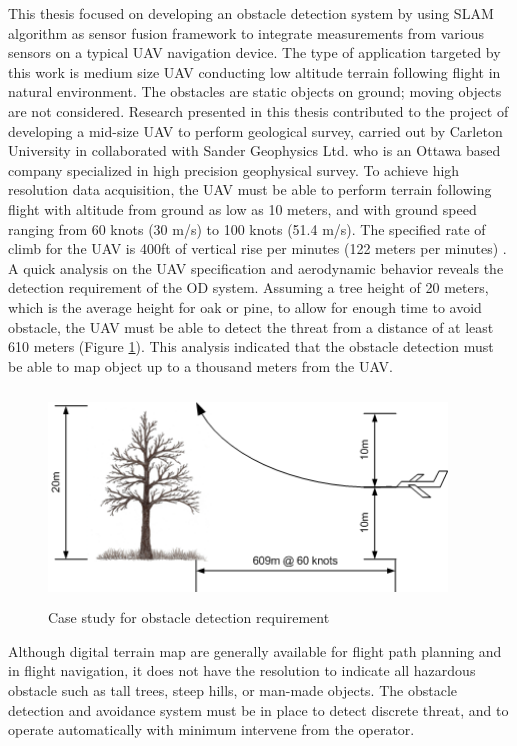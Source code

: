 This thesis focused on developing an obstacle detection system by
using SLAM algorithm as sensor fusion framework to integrate
measurements from various sensors on a typical UAV navigation device.
The type of application targeted by this work is medium size UAV
conducting low altitude terrain following flight in natural
environment. The obstacles are static objects on ground; moving
objects are not considered. Research presented in this thesis
contributed to the project of developing a mid-size UAV to perform
geological survey, carried out by Carleton University in collaborated
with Sander Geophysics Ltd. who is an Ottawa based company specialized in
high precision geophysical survey. To achieve high resolution data
acquisition, the UAV must be able to perform terrain following flight
with altitude from ground as low as 10 meters, and with ground speed
ranging from 60 knots (30 m/s) to 100 knots (51.4 m/s). The specified
rate of climb for the UAV is 400ft of vertical rise per minutes (122
meters per minutes) \cite{james_geosurv_2008}. A quick analysis on the
UAV specification and aerodynamic behavior reveals the detection
requirement of the OD system. Assuming a tree height of 20 meters,
which is the average height for oak or pine, to allow for enough time
to avoid obstacle, the UAV must be able to detect the threat from a
distance of at least 610 meters (Figure \ref{ob}). This analysis
indicated that the obstacle detection must be able to map object up to
a thousand meters from the UAV.

\begin{figure}[h]
\centering
\includegraphics[width=300pt,height=160pt]{./Figures/ProblemStatement.png}
\caption {Case study for obstacle detection requirement}
\label{ob}
\end{figure}

Although digital terrain map are generally available for flight path
planning and in flight navigation, it does not have the resolution to
indicate all hazardous obstacle such as tall trees, steep hills, or
man-made objects. The obstacle detection and avoidance system must be
in place to detect discrete threat, and to operate automatically with
minimum intervene from the operator.


